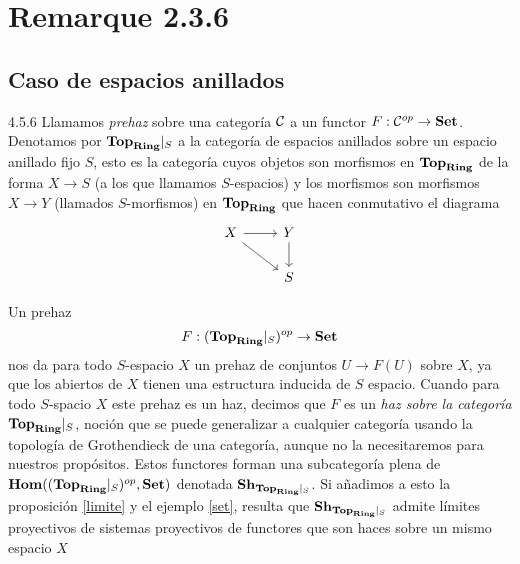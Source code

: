 \documentclass[twoside]{article}
\begin{document}
 




\section{Remarque 2.3.6}


 \subsection{Caso de espacios anillados}

\begin{remarque}{4.5.6}\label{prehaz}
Llamamos \emph{prehaz} sobre una categoría ${\mathcal C}$ a un functor $F:{\mathcal C}^{op}\to\mathrm{\mathbf{Set}}$. Denotamos por $\mathrm{\mathbf{Top}}_{\mathrm{\mathbf{Ring}}}|_S$ a la categoría de espacios anillados sobre un espacio anillado fijo $S$, esto es la categoría cuyos objetos son morfismos en $\mathrm{\mathbf{Top}}_{\mathrm{\mathbf{Ring}}}$ de la forma $X\to S$ (a los que llamamos $S$-espacios) y los morfismos son morfismos $X\to Y$ (llamados $S$-morfismos) en $\mathrm{\mathbf{Top}}_{\mathrm{\mathbf{Ring}}}$ que hacen conmutativo el diagrama
\[
\begin{tikzcd}
X\arrow[r]\arrow[dr] & Y\arrow[d]\\
 & S
\end{tikzcd}
\]

Un prehaz 
\begin{equation}\label{representable}
F:(\mathrm{\mathbf{Top}}_{\mathrm{\mathbf{Ring}}}|_S)^{op}\to\mathrm{\mathbf{Set}}
\end{equation}
 nos da para todo $S$-espacio $X$ un prehaz de conjuntos $U\to F(U)$ sobre $X$, ya que los abiertos de $X$ tienen una estructura inducida de $S$ espacio. Cuando para todo $S$-spacio $X$ este prehaz es un haz, decimos que $F$ es un \emph{haz sobre la categoría} $\mathrm{\mathbf{Top}}_{\mathrm{\mathbf{Ring}}}|_S$, noción que se puede generalizar a cualquier categoría usando la topología de Grothendieck de una categoría, aunque no la necesitaremos para nuestros propósitos. Estos functores forman una subcategoría plena de $\mathrm{\mathbf{Hom}}((\mathrm{\mathbf{Top}}_{\mathrm{\mathbf{Ring}}}|_S)^{op},\mathrm{\mathbf{Set}})$ denotada $\mathrm{\mathbf{Sh}}_{\mathrm{\mathbf{Top}}_{\mathrm{\mathbf{Ring}}}|_S}$. Si añadimos a esto la proposición \ref{limite} y el ejemplo \ref{set}, resulta que $\mathrm{\mathbf{Sh}}_{\mathrm{\mathbf{Top}}_{\mathrm{\mathbf{Ring}}}|_S}$ admite límites proyectivos de sistemas proyectivos de functores que son haces sobre un mismo espacio $X$  %



\end{remarque}
\end{document}

